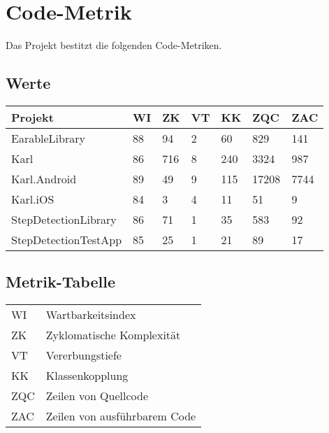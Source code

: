 \documentclass[../implementierung.tex]{subfiles}
\begin{document}
	\section{Code-Metrik}
		Das Projekt bestitzt die folgenden Code-Metriken.
		\subsection{Werte}
		\begin{tabular}{l|l|l|l|l|l|l}
			Projekt & WI & ZK & VT & KK & ZQC & ZAC \\
			\hline
			EarableLibrary & 88 & 94 & 2 & 60 & 829 & 141 \\
			Karl & 86 & 716 & 8 & 240 & 3324 & 987 \\
			Karl.Android & 89 & 49 & 9 & 115 & 17208 & 7744 \\
			Karl.iOS & 84 & 3 & 4 & 11 & 51 & 9 \\
			StepDetectionLibrary & 86 & 71 & 1 & 35 & 583 & 92 \\
			StepDetectionTestApp & 85 & 25 & 1 & 21 & 89 & 17 \\
		\end{tabular}
		\subsection{Metrik-Tabelle}
		\begin{tabular}{l|l}
			WI & Wartbarkeitsindex \\
			ZK & Zyklomatische Komplexität \\
			VT & Vererbungstiefe \\
			KK & Klassenkopplung \\
			ZQC & Zeilen von Quellcode \\
			ZAC & Zeilen von ausführbarem Code \\
		\end{tabular}
		\\
		\\
\end{document}
